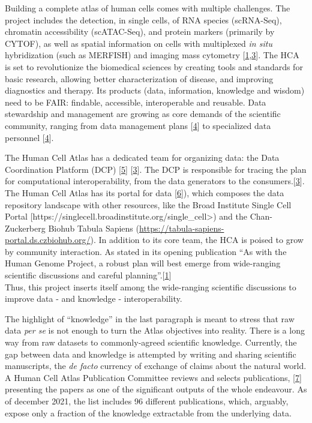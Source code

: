 Building a complete atlas of human cells comes with multiple challenges.
The project includes the detection, in single cells, of RNA species (scRNA-Seq), chromatin accessibility (scATAC-Seq), and protein markers (primarily by CYTOF), as well as spatial information on cells with multiplexed \emph{in situ} hybridization (such as MERFISH) and imaging mass cytometry {[}\protect\hyperlink{ref-1GmbExweg}{1},\protect\hyperlink{ref-kkwRTArg}{3}{]}.
The HCA is set to revolutionize the biomedical sciences by creating tools and standards for basic research, allowing better characterization of disease, and improving diagnostics and therapy.
Its products (data, information, knowledge and wisdom) need to be FAIR: findable, accessible, interoperable and reusable.
Data stewardship and management are growing as core demands of the scientific community, ranging from data management plans {[}\protect\hyperlink{ref-1DSEIjFha}{4}{]} to specialized data personnel {[}\protect\hyperlink{ref-1DSEIjFha}{4}{]}.

The Human Cell Atlas has a dedicated team for organizing data: the Data Coordination Platform (DCP) {[}\protect\hyperlink{ref-zDRzmIGu}{5}{]} {[}\protect\hyperlink{ref-kkwRTArg}{3}{]}.
The DCP is responsible for tracing the plan for computational interoperability, from the data generators to the consumers.{[}\protect\hyperlink{ref-kkwRTArg}{3}{]}.
The Human Cell Atlas has its portal for data {[}\protect\hyperlink{ref-kX6KnbUo}{6}{]}), which composes the data repository landscape with other resources, like the Broad Institute Single Cell Portal {[}https://singlecell.broadinstitute.org/single\_cell\textgreater) and the Chan-Zuckerberg Biohub Tabula Sapiens (\url{https://tabula-sapiens-portal.ds.czbiohub.org/}).
In addition to its core team, the HCA is poised to grow by community interaction.
As stated in its opening publication ``As with the Human Genome Project, a robust plan will best emerge from wide-ranging scientific discussions and careful planning''.{[}\protect\hyperlink{ref-1GmbExweg}{1}{]}\\
Thus, this project inserts itself among the wide-ranging scientific discussions to improve data - and knowledge - interoperability.

The highlight of ``knowledge'' in the last paragraph is meant to stress that raw data \emph{per se} is not enough to turn the Atlas objectives into reality.
There is a long way from raw datasets to commonly-agreed scientific knowledge.
Currently, the gap between data and knowledge is attempted by writing and sharing scientific manuscripts, the \emph{de facto} currency of exchange of claims about the natural world.
A Human Cell Atlas Publication Committee reviews and selects publications, {[}\protect\hyperlink{ref-2A7P3sTH}{7}{]} presenting the papers as one of the significant outputs of the whole endeavour.
As of december 2021, the list includes 96 different publications, which, arguably, expose only a fraction of the knowledge extractable from the underlying data.

